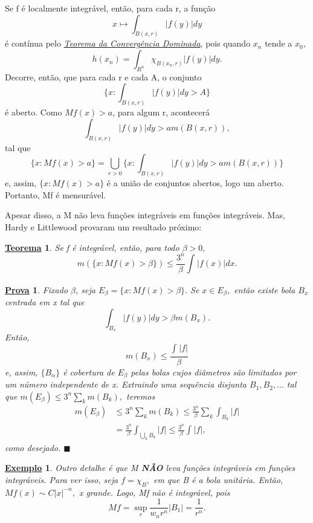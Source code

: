 \documentclass{article}
\newtheorem*{theorem*}{\underline{Teorema}}
\newtheorem{example}{\underline{Exemplo}}
\newtheorem*{proof*}{\underline{Prova}}
\renewcommand\qedsymbol{$\blacksquare$}
\begin{document}
  Se f é localmente integrável, então, para cada r, a função 
    \[
      x\mapsto \int_{B(x, r)}|f(y)| dy
    \]
  é contínua pelo \hyperlink{dominated_convergence}{\textit{Teorema da Convergência Dominada}}, pois quando \(x_{n}\) tende a \(x_{0}\), 
    \[
      h(x_{n}) = \int_{R^{n}}\chi_{B(x_{n}, r)}|f(y)| dy.
    \]
  Decorre, então, que para cada r e cada A, o conjunto 
    \[
      \biggl\{x: \int_{B(x, r)}|f(y)| dy  > A\biggr\}
    \]
  é aberto. Como \(Mf(x) > a\), para algum r, acontecerá 
    \[
      \int_{B(x, r)}|f(y)| dy > am(B(x, r)),
    \]
  tal que 
    \[
      \{x: Mf(x) > a\} = \bigcup_{r>0}^{}\biggl\{x: \int_{B(x, r)}|f(y)| dy > am(B(x, r))\biggr\}
    \]
  e, assim, \(\{x: Mf(x) > a\}\) é a união de conjuntos abertos, logo um aberto. Portanto, Mf é mensurável.

  Apesar disso, a M não leva funções integráveis em funções integráveis. Mas, Hardy e Littlewood provaram um resultado próximo: 
 \begin{theorem*}
   Se f é integrável, então, para todo \(\beta > 0,\) 
     \[
       m(\{x: Mf(x) > \beta \})\leq \frac{3^{n}}{\beta }\int_{}^{}|f(x)|dx.
     \]
 \end{theorem*}
\begin{proof*}
  Fixado \(\beta \), seja \(E_{\beta } = \{x: Mf(x) > \beta \}.\) Se \(x\in E_{\beta },\) então existe bola \(B_{x}\) centrada em x tal que 
    \[
      \int_{B_{x}}|f(y)| dy > \beta m (B_{x}).
    \]
  Então, 
    \[
      m(B_{x}) \leq \frac{\int_{}^{}|f|}{\beta }
    \]
  e, assim, \(\{B_{\alpha }\}\) é cobertura de \(E_{\beta }\) pelas bolas cujos diâmetros são limitados por um número independente de x. Extraindo uma sequência disjunta \(B_{1}, B_2, \dotsc \) tal que \(m(E_{\beta }) \leq 3^{n}\sum\limits_{k}^{}m(B_{k}),\) teremos 
 \begin{align*}
   m(E_{\beta }) &\leq 3^{n}\sum\limits_{k}^{}m(B_{k}) \leq \frac{3^{n}}{\beta }\sum\limits_{k}^{}\int_{B_{k}}|f|\\ 
                 &= \frac{3^{n}}{\beta }\int_{\bigcup_{k}^{}B_{k}}|f| \leq \frac{3^{n}}{\beta }\int_{}^{}|f|,
 \end{align*}
  como desejado. \qedsymbol
\end{proof*}
 \begin{example}
  Outro detalhe é que M \textbf{NÃO} leva funções integráveis em funções integráveis. Para ver isso, seja \(f = \chi_{B},\) em que B é a bola unitária. Então, \(Mf(x)\sim C|x|^{-n},\) x grande. Logo, Mf não é integrável, pois 
    \[
      Mf = \sup_{r}\frac{1}{w_{n}r^{n}}|B_1| = \frac{1}{r^{n}}.
    \]
 \end{example}
\end{document}
